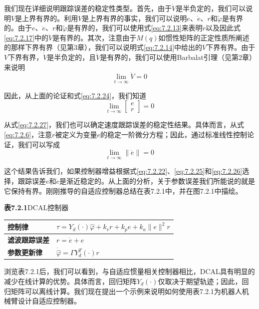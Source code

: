 \documentclass[UTF8]{ctexart}
\begin{document}
我们现在详细说明跟踪误差的稳定性类型。首先，由于$\dot{V}$是半负定的，我们可以说明$V$是上界有界的。利用$V$是上界有界的事实，我们可以说明$e$、$\dot{e}$、$r$和$\tilde{\varphi}$是有界的。由于$e$、$\dot{e}$、$r$和$\tilde{\varphi}$是有界的，我们可以使用式\eqref{eq:7.2.13}来表明$\dot{r}$以及因此式\eqref{eq:7.2.17}中的$\ddot{V}$是有界的。其次，注意由于$M(q)$如惯性矩阵的正定性质所阐述的那样下界有界（见第3章），我们可以说明式\eqref{eq:7.2.14}中给出的$V$下界有界。由于$V$下界有界，$\dot{V}$是半负定的，且$\ddot{V}$是有界的，我们可以使用Barbalat引理（见第2章）来说明
\begin{equation*}
\lim_{t \to \infty} \dot{V} = 0
\end{equation*}

因此，从上面的论证和式\eqref{eq:7.2.24}，我们知道
\begin{equation}\label{eq:7.2.27}
\lim_{t \to \infty} \begin{bmatrix} e \\ r \end{bmatrix} = 0
\end{equation}

从式\eqref{eq:7.2.27}，我们也可以确定速度跟踪误差的稳定性结果。具体而言，从式\eqref{eq:7.2.6}，注意$r$被定义为变量$e$的稳定一阶微分方程；因此，通过标准线性控制论证，我们可以写成
\begin{equation}\label{eq:7.2.28}
\lim_{t \to \infty} \|\dot{e}\| = 0
\end{equation}

这个结果告诉我们，如果控制器增益根据式\eqref{eq:7.2.22}、\eqref{eq:7.2.25}和\eqref{eq:7.2.26}选择，跟踪误差$e$和$\dot{e}$是渐近稳定的。从上面的分析，关于参数误差我们所能说的就是它保持有界。刚刚推导的自适应控制器总结在表7.2.1中，并在图7.2.1中描绘。

\textbf{表7.2.1}\quad DCAL控制器

\begin{center}
\begin{tabular}{|l|l|}
\hline
\textbf{控制律} & $\tau = Y_d(\cdot)\hat{\varphi} + k_v r + k_p e + k_a \|e\|^2 r$ \\
\hline
\textbf{滤波跟踪误差} & $r = \dot{e} + e$ \\
\hline
\textbf{参数更新律} & $\dot{\hat{\varphi}} = \Gamma Y_d^T(\cdot) r$ \\
\hline
\end{tabular}
\end{center}

浏览表7.2.1后，我们可以看到，与自适应惯量相关控制器相比，DCAL具有明显的减少在线计算的优势。具体而言，回归矩阵$Y_d(\cdot)$仅取决于期望轨迹；因此，回归矩阵可以离线计算。我们现在提出一个示例来说明如何使用表7.2.1为机器人机械臂设计自适应控制器。
\end{document}
